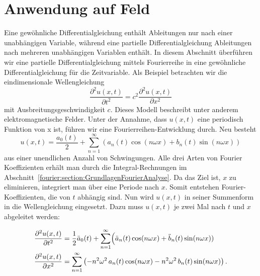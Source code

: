 %
%
%
%



\section{Anwendung auf Feld\label{fourier:section:AnwendungAufFeld}}

Eine gewöhnliche Differentialgleichung enthält Ableitungen nur nach einer unabhängigen Variable, während eine partielle Differentialgleichung Ableitungen nach mehreren unabhängigen Variablen enthält.  
In diesem Abschnitt überführen wir eine partielle Differentialgleichung mittels Fourierreihe in eine gewöhnliche Differentialgleichung für die Zeitvariable.
Als Beispiel betrachten wir die eindimensionale Wellengleichung  
\begin{equation}\label{eq:wellengleichung}
	\frac{\partial^2 u(x,t)}{\partial t^2} = c^2 \frac{\partial^2 u(x,t)}{\partial x^2}
\end{equation}  
mit Ausbreitungsgeschwindigkeit $c$. Dieses Modell beschreibt unter anderem elektromagnetische Felder.  
Unter der Annahme, dass $u(x, t)$ eine periodisch Funktion von x ist, führen wir eine Fourierreihen-Entwicklung durch. 
Neu besteht 
\begin{equation}
	u(x,t) = \frac{a_0(t)}{2} + \sum_{n=1}^{\infty} \left( a_n(t) \cos(n \omega x) + b_n(t) \sin(n \omega x) \right)
\end{equation}
aus einer unendlichen Anzahl von Schwingungen.
Alle drei Arten von Fourier Koeffizienten erhält man durch die Integral-Rechnungen im Abschnitt~\ref{fourier:section:GrundlagenFourierAnalyse}. 
Da das Ziel ist, $x$ zu eliminieren, integriert man über eine Periode nach $x$.
Somit entstehen Fourier-Koeffizienten, die von $t$ abhängig sind. 
Nun wird $u(x,t)$ in seiner Summenform in die Wellengleichung eingesetzt. 
Dazu muss $u(x,t)$ je zwei Mal nach $t$ und $x$ abgeleitet werden:

\begin{equation}
	\begin{aligned}
		\frac{\partial^2 u(x,t)}{\partial t^2}
		&= \frac{1}{2}\ddot{a}_0(t) + \sum_{n=1}^{\infty}\Bigl(\ddot{a}_n(t)\cos(n\omega x)+ \ddot{b}_n(t)\sin(n\omega x))
		\\
		\frac{\partial^2 u(x,t)}{\partial x^2}
		&= \sum_{n=1}^{\infty}\left(-n^2\omega^2\,a_n(t)\cos(n\omega x)-n^2\omega^2\,b_n(t)\sin(n\omega x)\right).
	\end{aligned}
\end{equation}

